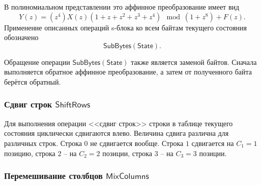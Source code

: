 В полиномиальном представлении это аффинное преобразование имеет вид
\[Y(z)=(z^4)X(z)(1+z+z^2+z^3+z^4)\mod(1+z^8) + F(z).\]
Применение описанных операций s-блока ко всем байтам текущего состояния обозначено
    \[ \mathsf{SubBytes(State)}. \]

Обращение операции $\mathsf{SubBytes(State)}$ также является заменой байтов. Сначала выполняется обратное аффинное преобразование, а затем от полученного байта берётся обратный.


\subsubsection{Сдвиг строк $\mathsf{ShiftRows}$}

Для выполнения операции <<сдвиг строк>> строки в таблице текущего состояния циклически сдвигаются влево. Величина сдвига различна для различных строк. Строка $0$ не сдвигается вообще. Строка $1$ сдвигается на $C_1=1$ позицию, строка $2$ -- на $C_2=2$ позиции, строка $3$ -- на $C_3=3$ позиции.
%


\subsubsection{Перемешивание столбцов $\mathsf{Mix Columns}$}

